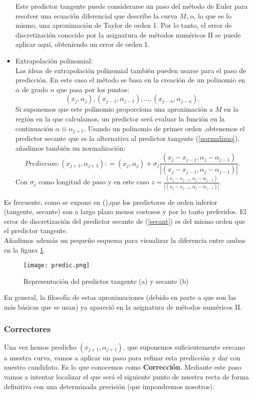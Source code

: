 \begin{itemize}
Este predictor tangente puede considerarse un paso del método de Euler para resolver una ecuación diferencial que describe la curva $M$, o, lo que es lo mismo, una aproximación de Taylor de orden 1. Por lo tanto, el error de discretización conocido por la asignatura de métodos numéricos II se puede aplicar aquí, obteniendo un error de orden 1.

\item Extrapolación polinomial:\\
Las ideas de extrapolación polinomial también pueden usarse para el paso de predicción. En este caso el método  se basa en la creación de  un polinomio en $\alpha$ de grado $n$ que pasa por los puntos:
\[ (x_j, \alpha_j), (x_{j-1}, \alpha_{j-1}),. . . , (x_{j-n}, \alpha_{j-n}). \]
Si suponemos que este polinomio proporciona una aproximación a $M$ en la región en la que calculamos, un predictor será evaluar la función en  la continuación $\alpha \equiv \alpha_{j + 1}$. 
Usando un polinomio de primer orden ,obtenemos el predictor secante que es la alternativa al predictor tangente (\ref{normalizao}), añadimos también un normalización:
\begin{equation}
Prediccion: ( x_{j + 1}, \alpha_{j + 1}): = (x_j, \alpha_j) + \sigma_j \frac{(x_j - x_{j-1} , \alpha_j - \alpha_{j-1})}{|(x_j - x_{j-1} , \alpha_j - \alpha_{j-1})|}.
\label{secant}
\end{equation}
 Con $\sigma_j$ como longitud de paso y en este caso $z=\frac{(x_j - x_{j-1} , \alpha_j - \alpha_{j-1})}{|(x_j - x_{j-1} , \alpha_j - \alpha_{j-1})|}. $
\end{itemize}
 Es frecuente, como se expone en (\cite{prac}),que  los predictores de orden inferior (tangente, secante) son a largo plazo menos costosos y por lo tanto preferidos. El error de discretización del predictor secante de (\ref{secant}) es del mismo orden que el predictor tangente.\\
 Añadimos además un pequeño esquema para visualizar la diferencia entre ambas en la figura \ref{tangent}.
  \begin{figure}[h]
  	\centering
  	\texttt{[image: predic.png]}
  	\caption{Representación del predictor tangente (a) y secante (b)}
  	\label{tangent}
  \end{figure}
 En general, la filosofía de estas aproximaciones (debido en parte a que son las más básicas que se usan) ya apareció en la asignatura de métodos numéricos II.
\subsubsection{Correctores}
 Una vez hemos predicho $( x_{j + 1}, \alpha_{j + 1})$, que suponemos suficientemente cercano a nuestra curva, vamos a aplicar un paso para refinar esta predicción y dar con nuestro candidato. Es lo que conocemos como \textbf{Corrección}. Mediante este paso vamos a intentar localizar el que será el siguiente punto de nuestra recta de forma definitiva con una determinada precisión (que impondremos nosotros).
 
